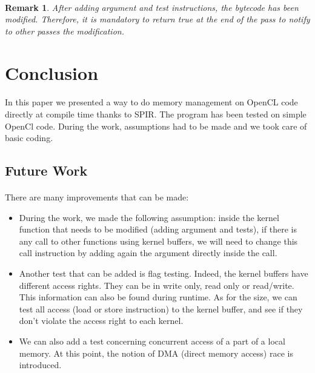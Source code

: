 \documentclass{article}
\newtheorem*{remark}{Remark}
\begin{document}
\begin{itemize}
\paragraph{}
\begin{remark}
After adding argument and test instructions, the bytecode has been modified. Therefore, it is mandatory to return true at the end of the pass to notify to other passes the modification.
\end{remark}


\section{Conclusion}

\paragraph{}
In this paper we presented a way to do memory management on OpenCL code directly at compile time thanks to SPIR. The program has been tested on simple OpenCl code. During the work, assumptions had to be made and we took care of basic coding. 

\subsection{Future Work}

\paragraph{}
There are many improvements that can be made: 
\begin{itemize}
\item During the work, we made the following assumption: inside the kernel function that needs to be modified (adding argument and tests), if there is any call to other functions using kernel buffers, we will need to change this call instruction by adding again the argument directly inside the call.
\item Another test that can be added is flag testing. Indeed, the kernel buffers have different access rights. They can be in write only, read only or read/write. This information can also be found during runtime. As for the size, we can test all access (load or store instruction) to the kernel buffer, and see if they don't violate the access right to each kernel.
\item We can also add a test concerning concurrent access of a part of a local memory. At this point, the notion of DMA (direct memory access) race is introduced. 
\end{itemize}


\end{itemize}
\end{document}
